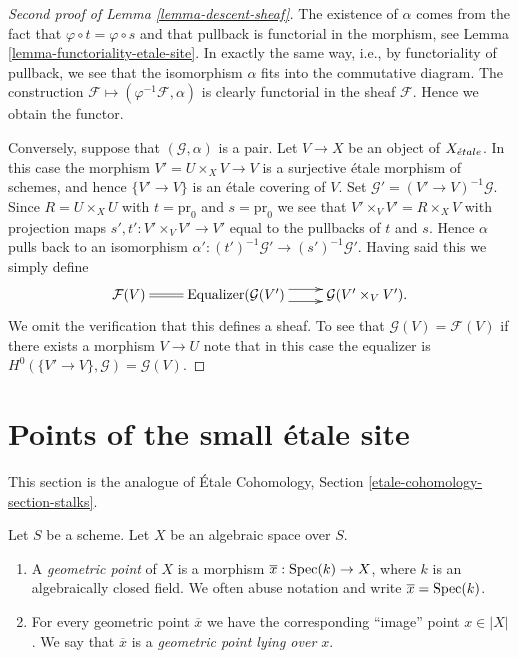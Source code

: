 \begin{proof}[Second proof of Lemma \ref{lemma-descent-sheaf}]
The existence of $\alpha$ comes from the fact that
$\varphi \circ t = \varphi \circ s$ and that pullback is
functorial in the morphism, see
Lemma \ref{lemma-functoriality-etale-site}.
In exactly the same way, i.e., by functoriality of pullback, we see
that the isomorphism $\alpha$ fits into the commutative diagram.
The construction $\mathcal{F} \mapsto (\varphi^{-1}\mathcal{F}, \alpha)$
is clearly functorial in the sheaf $\mathcal{F}$.
Hence we obtain the functor.

\medskip\noindent
Conversely, suppose that $(\mathcal{G}, \alpha)$ is a pair.
Let $V \to X$ be an object of $X_{\acute{e}tale}$.
In this case the morphism $V' = U \times_X V \to V$ is a surjective \'etale
morphism of schemes, and hence $\{V' \to V\}$ is an \'etale
covering of $V$. Set $\mathcal{G}' = (V' \to V)^{-1}\mathcal{G}$.
Since $R = U \times_X U$ with $t = \text{pr}_0$
and $s = \text{pr}_0$ we see that $V' \times_V V' = R \times_X V$
with projection maps $s', t' : V' \times_V V' \to V'$ equal to the pullbacks
of $t$ and $s$. Hence $\alpha$ pulls back to an isomorphism
$\alpha' : (t')^{-1}\mathcal{G}' \to (s')^{-1}\mathcal{G}'$. Having said this
we simply define
$$
\xymatrix{
\mathcal{F}(V) \ar@{=}[r] &
\text{Equalizer}(\mathcal{G}(V') \ar@<1ex>[r] \ar@<-1ex>[r] &
\mathcal{G}(V' \times_V V').
}
$$
We omit the verification that this defines a sheaf. To see that
$\mathcal{G}(V) = \mathcal{F}(V)$ if there exists a morphism $V \to U$
note that in this case the equalizer is
$H^0(\{V' \to V\}, \mathcal{G}) = \mathcal{G}(V)$.
\end{proof}







\section{Points of the small \'etale site}
\label{section-points-small-etale-site}

\noindent
This section is the analogue of
\'Etale Cohomology, Section
\ref{etale-cohomology-section-stalks}.

\begin{definition}
\label{definition-geometric-point}
Let $S$ be a scheme. Let $X$ be an algebraic space over $S$.
\begin{enumerate}
\item A {\it geometric point} of $X$ is a morphism
$\overline{x} : \mathop{\mathrm{Spec}}(k) \to X$, where $k$ is an algebraically
closed field. We often abuse notation and
write $\overline{x} = \mathop{\mathrm{Spec}}(k)$.
\item For every geometric point $\overline{x}$ we have the corresponding
``image'' point $x \in |X|$. We say that $\overline{x}$ is a
{\it geometric point lying over $x$}.
\end{enumerate}
\end{definition}

